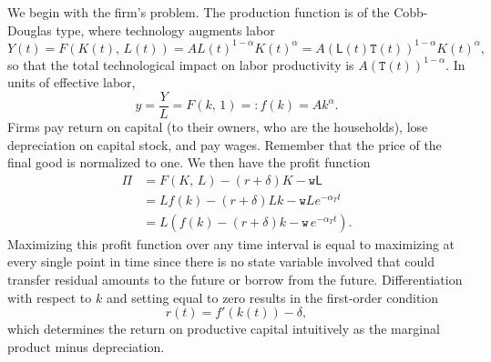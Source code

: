 \documentclass[graybox]{svmult}
\begin{document}
We begin with the firm's problem.  The production function is of the Cobb-Douglas type, where technology augments labor
\[
Y(t) = F(K(t),\, L(t)) = A L(t)^{1-\alpha} K(t)^{\alpha} = A (\mathsf{L}(t)\mathtt{T}(t))^{1-\alpha} K(t)^{\alpha},
\]
so that the total technological impact on labor productivity is $A(\mathtt{T}(t))^{1-\alpha}$.  In units of effective labor,
\[
y = \frac{Y}{L} = F(k,\, 1) =: f(k) = A k^\alpha.
\]
Firms pay return on capital (to their owners, who are the households), lose depreciation on capital stock, and pay wages.  Remember that the price of the final good is normalized to one. We then have the profit function
\begin{align*}
\Pi &= F(K,\, L) - (r+\delta) K - \mathtt{w}\mathsf{L}\\
 &= L f(k) - (r+\delta) Lk - \mathtt{w}Le^{-\alpha_T t}\\
 &= L \left( f(k) - (r+\delta) k - \mathtt{w}\, e^{-\alpha_T t} \right).
\end{align*}
Maximizing this profit function over any time interval is equal to maximizing at every single point in time since there is no state variable involved that could transfer residual amounts to the future or borrow from the future.  Differentiation with respect to $k$ and setting equal to zero results in the first-order condition
\begin{equation}\label{Eq:RamseyFirms1}
r(t) = f'(k(t)) - \delta,
\end{equation}
which determines the return on productive capital intuitively as the marginal product minus depreciation.

\smallskip
\end{document}
